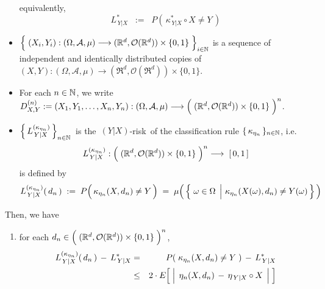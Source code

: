 \begin{theorem}
\begin{itemize}
	equivalently,
	\begin{equation*}
	L^{*}_{\,Y \vert X} \;\; := \;\; P\!\left(\, \kappa^{*}_{\,Y \vert X} \circ X \neq Y \,\right)
	\end{equation*}	
\item
	$\left\{\;
		(X_{i},Y_{i}) : (\Omega,\mathcal{A},\mu)
			\overset{{\color{white}-}}{\longrightarrow}
			(\Re^{d},\mathcal{O}(\Re^{d})) \times \{0,1\}
	\;\right\}_{i\in\N}$\;
	is a sequence of independent and identically distributed copies of
	$(X,Y) : (\Omega,\mathcal{A},\mu) \longrightarrow (\Re^{d},\mathcal{O}(\Re^{d})) \times \{0,1\}$.
\item
	For each $n \in \mathbb{N}$, we write
	$D^{(n)}_{X,Y} := (X_{1},Y_{1},\ldots,X_{n},Y_{n}) :
		(\Omega,\mathcal{A},\mu)
		\longrightarrow
		\left(\;(\Re^{d},\mathcal{O}(\Re^{d})) \overset{{\color{white}.}}{\times} \{0,1\} \;\right)^{n}$.
\item
	$\left\{\,L^{(\kappa_{\eta_{n}})}_{\,Y \vert X}\,\right\}_{n\in\mathbb{N}}$\,
	is the \,$(Y \vert X)$-risk\, of the classification rule $\{\,\kappa_{\eta_{n}}\,\}_{n\in\mathbb{N}}$, i.e.
	\begin{equation*}
	L^{(\kappa_{\eta_{n}})}_{\,Y \vert X} :
		\left(\;(\Re^{d},\mathcal{O}(\Re^{d})) \overset{{\color{white}.}}{\times} \{0,1\} \;\right)^{n} \longrightarrow\; [\,0,1\,]
	\end{equation*}
	is defined by
	\begin{equation*}
	L^{(\kappa_{\eta_{n}})}_{\,Y \vert X}(\,d_{n}\,)
	\; := \;
		P\!\left(\, \kappa_{\eta_{n}}(X,d_{n}) \overset{{\color{white}.}}{\neq} Y \,\right)
	\; = \;
		\mu\!\left(\,\left\{\,
			\left.\omega\overset{{\color{white}.}}{\in}\Omega\;\,\right\vert\,\kappa_{\eta_{n}}(X(\omega),d_{n}) \neq Y(\omega)
			\,\right\}\,\right)
	\end{equation*}
\end{itemize}
Then, we have
\begin{enumerate}
\item
	for each
	\;$d_{n} \in \left(\;(\Re^{d},\mathcal{O}(\Re^{d})) \overset{{\color{white}.}}{\times} \{0,1\} \;\right)^{n}$,
	\begin{eqnarray*}
	L^{(\kappa_{\eta_{n}})}_{\,Y \vert X}(\,d_{n}\,) \, - \, L^{*}_{\,Y \vert X}
	& = &
		P\!\left(\;\kappa_{\eta_{n}}(X,d_{n}) \neq Y \;\right) \,-\, L^{*}_{\,Y \vert X}
	\\
	& \leq &
		2 \cdot E\!\left[\;
			\left\vert\;\, \eta_{n}(X,d_{n}) \,\overset{{\color{white}.}}{-}\, \eta_{\,Y\vert X} \circ X \;\,\right\vert
			\;\right]
	\\

\end{eqnarray*}
\end{enumerate}
\end{theorem}
